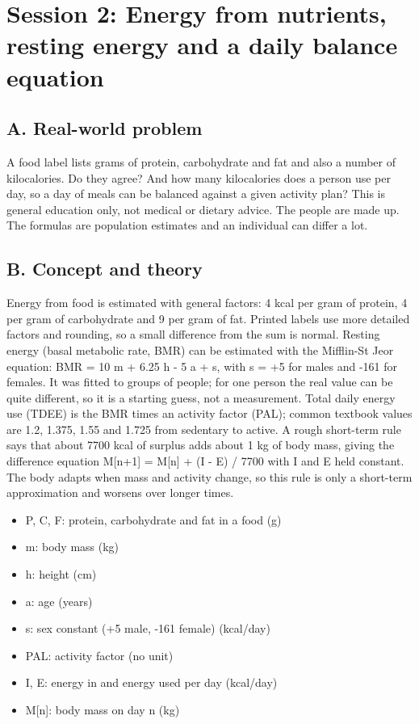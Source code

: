 \documentclass[11pt,a4paper]{article}
\begin{document}
\section{Session 2: Energy from nutrients, resting energy and a daily balance equation}

\subsection*{A. Real-world problem}
A food label lists grams of protein, carbohydrate and fat and also a number of kilocalories. Do they agree? And how many kilocalories does a person use per day, so a day of meals can be balanced against a given activity plan? This is general education only, not medical or dietary advice. The people are made up. The formulas are population estimates and an individual can differ a lot.

\subsection*{B. Concept and theory}
Energy from food is estimated with general factors: 4 kcal per gram of protein, 4 per gram of carbohydrate and 9 per gram of fat. Printed labels use more detailed factors and rounding, so a small difference from the sum is normal. Resting energy (basal metabolic rate, BMR) can be estimated with the Mifflin-St Jeor equation: BMR = 10 m + 6.25 h - 5 a + s, with s = +5 for males and -161 for females. It was fitted to groups of people; for one person the real value can be quite different, so it is a starting guess, not a measurement. Total daily energy use (TDEE) is the BMR times an activity factor (PAL); common textbook values are 1.2, 1.375, 1.55 and 1.725 from sedentary to active. A rough short-term rule says that about 7700 kcal of surplus adds about 1 kg of body mass, giving the difference equation M[n+1] = M[n] + (I - E) / 7700 with I and E held constant. The body adapts when mass and activity change, so this rule is only a short-term approximation and worsens over longer times.

\begin{itemize}[nosep]
\item P, C, F: protein, carbohydrate and fat in a food (g)
\item m: body mass (kg)
\item h: height (cm)
\item a: age (years)
\item s: sex constant (+5 male, -161 female) (kcal/day)
\item PAL: activity factor (no unit)
\item I, E: energy in and energy used per day (kcal/day)
\item M[n]: body mass on day n (kg)
\end{itemize}
\end{document}
